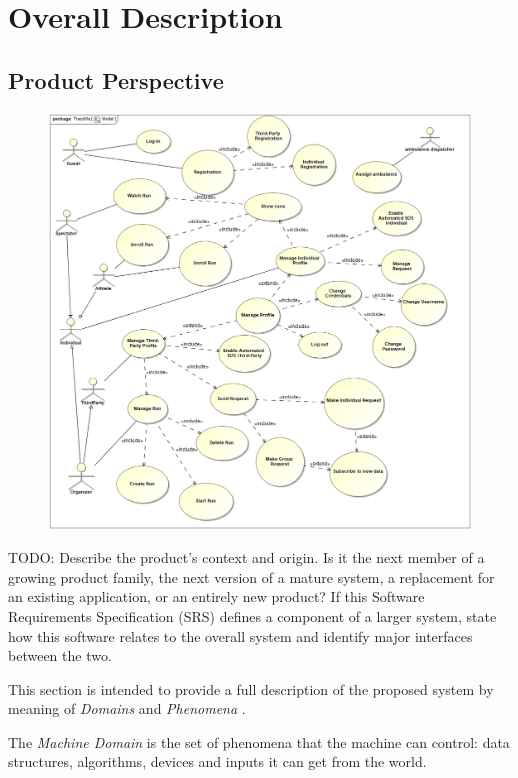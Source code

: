 \documentclass[a4paper]{article}
\begin{document}
\section{Overall Description}
    \subsection{Product Perspective}
    
     \begin{figure}[!htpb]
    	\centering
    	\includegraphics[scale=0.44]{images/UML/Model.jpg}
    \end{figure}
    \newpage
    TODO:
    Describe the product's context and origin. Is it the next member of a growing product family, the next version of a mature system, a replacement for an existing application, or an entirely new product? If this Software Requirements Specification (SRS) defines a component of a larger system, state how this software relates to the overall system and identify major interfaces between the two.  
    
    
    This section is intended to provide a full description of the proposed system by meaning of \textit{Domains} and \textit{Phenomena} \cite{zave1997four}.
    
    The \textit{Machine Domain} is the set of phenomena that the machine can control: data structures, algorithms, devices and inputs it can get from the world.
    
\end{document}
